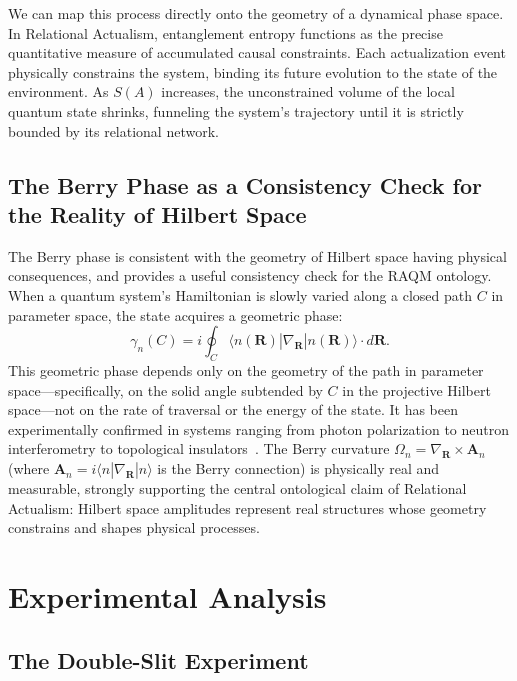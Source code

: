 \documentclass[11pt,a4paper]{article}
\theoremstyle{plain}
\theoremstyle{definition}
\theoremstyle{remark}
\newcommand{\ket}[1]{|#1\rangle}
\newcommand{\bra}[1]{\langle #1|}
\begin{document}
We can map this process directly onto the geometry of a dynamical phase space. In
Relational Actualism, entanglement entropy functions as the precise quantitative
measure of accumulated causal constraints. Each actualization event physically
constrains the system, binding its future evolution to the state of the
environment. As $S(A)$ increases, the unconstrained volume of the local quantum
state shrinks, funneling the system's trajectory until it is strictly bounded by
its relational network.

\subsection{The Berry Phase as a Consistency Check for the Reality of Hilbert Space}

The Berry phase is consistent with the geometry of Hilbert space having physical
consequences, and provides a useful consistency check for the RAQM ontology. When a quantum system's Hamiltonian is
slowly varied along a closed path $C$ in parameter space, the state acquires a
geometric phase:
\begin{equation}
  \gamma_n(C) = i \oint_C \bra{n(\mathbf{R})}\nabla_{\mathbf{R}}\ket{n(\mathbf{R})}
  \cdot d\mathbf{R}.
\end{equation}
This geometric phase depends only on the geometry of the path in parameter
space---specifically, on the solid angle subtended by $C$ in the projective
Hilbert space---not on the rate of traversal or the energy of the state. It has
been experimentally confirmed in systems ranging from photon polarization to
neutron interferometry to topological insulators~\citep{Cohen2019}. The Berry
curvature $\Omega_n = \nabla_{\mathbf{R}} \times \mathbf{A}_n$ (where
$\mathbf{A}_n = i\bra{n}\nabla_{\mathbf{R}}\ket{n}$ is the Berry connection) is
physically real and measurable, strongly supporting the central ontological claim
of Relational Actualism: Hilbert space amplitudes represent real structures whose
geometry constrains and shapes physical processes.

\section{Experimental Analysis}
\label{sec:experiment}

\subsection{The Double-Slit Experiment}
\end{document}
